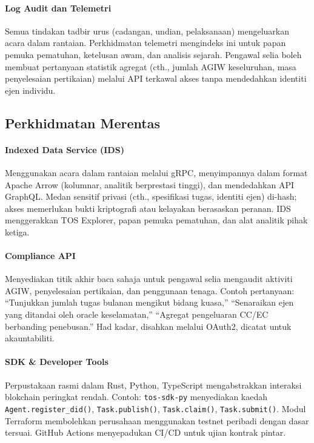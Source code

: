 \documentclass[11pt]{article}
\begin{document}
\paragraph{Log Audit dan Telemetri} Semua tindakan tadbir urus (cadangan, undian, pelaksanaan) mengeluarkan acara dalam rantaian. Perkhidmatan telemetri mengindeks ini untuk papan pemuka pematuhan, ketelusan awam, dan analisis sejarah. Pengawal selia boleh membuat pertanyaan statistik agregat (cth., jumlah AGIW keseluruhan, masa penyelesaian pertikaian) melalui API terkawal akses tanpa mendedahkan identiti ejen individu.

\subsection{Perkhidmatan Merentas}
\paragraph{Indexed Data Service (IDS)} Menggunakan acara dalam rantaian melalui gRPC, menyimpannya dalam format Apache Arrow (kolumnar, analitik berprestasi tinggi), dan mendedahkan API GraphQL. Medan sensitif privasi (cth., spesifikasi tugas, identiti ejen) di-hash; akses memerlukan bukti kriptografi atau kelayakan berasaskan peranan. IDS menggerakkan TOS Explorer, papan pemuka pematuhan, dan alat analitik pihak ketiga.

\paragraph{Compliance API} Menyediakan titik akhir baca sahaja untuk pengawal selia mengaudit aktiviti AGIW, penyelesaian pertikaian, dan penggunaan tenaga. Contoh pertanyaan: ``Tunjukkan jumlah tugas bulanan mengikut bidang kuasa,'' ``Senaraikan ejen yang ditandai oleh oracle keselamatan,'' ``Agregat pengeluaran CC/EC berbanding penebusan.'' Had kadar, disahkan melalui OAuth2, dicatat untuk akauntabiliti.

\paragraph{SDK \& Developer Tools} Perpustakaan rasmi dalam Rust, Python, TypeScript mengabstrakkan interaksi blokchain peringkat rendah. Contoh: \texttt{tos-sdk-py} menyediakan kaedah \texttt{Agent.register\_did()}, \texttt{Task.publish()}, \texttt{Task.claim()}, \texttt{Task.submit()}. Modul Terraform membolehkan perusahaan menggunakan testnet peribadi dengan dasar tersuai. GitHub Actions menyepadukan CI/CD untuk ujian kontrak pintar.
\end{document}
